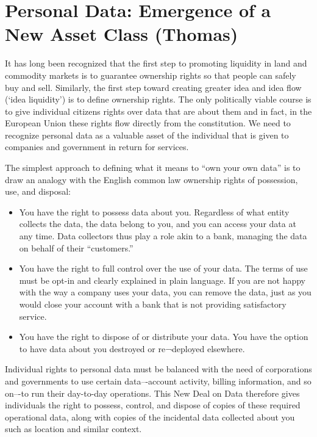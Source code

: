 \section{Personal Data: Emergence of a New Asset Class (Thomas)}

It has long been recognized that the first step to promoting liquidity in land and commodity markets is to guarantee ownership rights so that people can safely buy and sell.
Similarly, the first step toward creating greater idea and idea flow (`idea liquidity’) is to define ownership rights.
The only politically viable course is to give individual citizens rights over data that are about them and in fact, in the European Union these rights flow directly from the constitution.
We need to recognize personal data as a valuable asset of the individual that is given to companies and government in return for services.

The simplest approach to defining what it means to “own your own data” is to draw an analogy with the English common law ownership rights of possession, use, and disposal:

\begin{itemize}
\item You have the right to possess data about you. Regardless of what entity collects the data, the data belong to you, and you can access your data at any time. Data collectors thus play a role akin to a bank, managing the data on behalf of their “customers.”

\item You have the right to full control over the use of your data. The terms of use must be opt-in and clearly explained in plain language. If you are not happy with the way a company uses your data, you can remove the data, just as you would close your account with a bank that is not providing satisfactory service.

\item You have the right to dispose of or distribute your data. You have the option to have data about you destroyed or re¬deployed elsewhere.

\end{itemize}

Individual rights to personal data must be balanced with the need of corporations and governments to use certain data–-account activity, billing information, and so on–-to run their day-to-day operations.
This New Deal on Data therefore gives individuals the right to possess, control, and dispose of copies of these required operational data, along with copies of the incidental data collected about you such as location and similar context.

